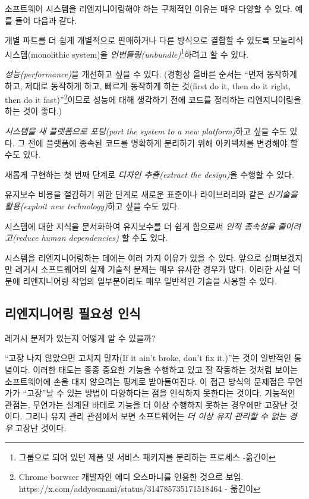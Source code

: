 \documentclass[a4paper,10pt,twoside]{book}
\begin{document}
소프트웨어 시스템을 리엔지니어링해야 하는 구체적인 이유는 매우 다양할 수 있다. 예를 들어 다음과 같다.
\begin{bulletlist}
  \item 개별 파트를 더 쉽게 개별적으로 판매하거나 다른 방식으로 결합할 수 있도록 모놀리식 시스템(monolithic system)을 \emph{언번들링(unbundle)}\footnote{그룹으로 되어 있던 제품 및 서비스 패키지를 분리하는 프로세스 -옮긴이}하려고 할 수 있다.

  \item \emph{성능(performance)}을 개선하고 싶을 수 있다. (경험상 올바른 순서는 ``먼저 동작하게 하고, 제대로 동작하게 하고, 빠르게 동작하게 하는 것(first do it, then do it right, then do it fast)''\footnote{Chrome borwser 개발자인 에디 오스마니를 인용한 것으로 보임. https://x.com/addyosmani/status/314785735171518464 - 옮긴이}이므로 성능에 대해 생각하기 전에 코드를 정리하는 리엔지니어링을 하는 것이 좋다.)

  \item \emph{시스템을 새 플랫폼으로 포팅(port the system to a new platform)}하고 싶을 수도 있다. 그 전에 플랫폼에 종속된 코드를 명확하게 분리하기 위해 아키텍처를 변경해야 할 수도 있다.

  \item 새롭게 구현하는 첫 번째 단계로 \emph{디자인 추출(extract the design)}을 수행할 수 있다.

  \item 유지보수 비용을 절감하기 위한 단계로 새로운 표준이나 라이브러리와 같은 \emph{신기술을 활용(exploit new technology)}하고 싶을 수도 있다.
  
  \item 시스템에 대한 지식을 문서화하여 유지보수를 더 쉽게 함으로써 \emph{인적 종속성을 줄이려고(reduce human dependencies)} 할 수도 있다.
\end{bulletlist}

시스템을 리엔지니어링하는 데에는 여러 가지 이유가 있을 수 있다. 앞으로 살펴보겠지만 레거시 소프트웨어의 실제 기술적 문제는 매우 유사한 경우가 많다. 이러한 사실 덕분에 리엔지니어링 작업의 일부분이라도 매우 일반적인 기술을 사용할 수 있다.

\subsection*{리엔지니어링 필요성 인식}

레거시 문제가 있는지 어떻게 알 수 있을까? 

``고장 나지 않았으면 고치지 말자(If it ain't broke, don't fix it.)''는 것이 일반적인 통념이다. 이러한 태도는 종종 중요한 기능을 수행하고 있고 잘 작동하는 것처럼 보이는 소프트웨어에 손을 대지 않으려는 핑계로 받아들여진다. 이 접근 방식의 문제점은 무언가가 ``고장''날 수 있는 방법이 다양하다는 점을 인식하지 못한다는 것이다. 기능적인 관점는, 무언가는 설계된 바데로 기능을 더 이상 수행하지 못하는 경우에만 고장난 것이다. 그러나 유지 관리 관점에서 보면 소프트웨어는 \emph{더 이상 유지 관리할 수 없는 경우} 고장난 것이다.
\end{document}
